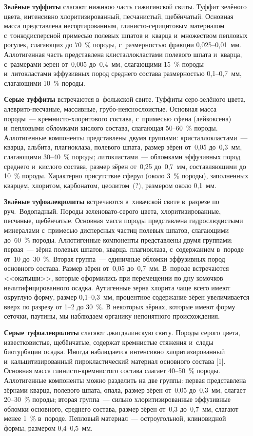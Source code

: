 \textbf{Зелёные туффиты} слагают нижнюю часть гижигинской свиты. Туффит зелёного цвета, интенсивно хлоритизированный, песчанистый, щебёнчатый. Основная масса представлена несортированным, глинисто-серицитовым материалом с~тонкодисперсной примесью полевых шпатов и~кварца и~множеством пепловых рогулек, слагающих до 70~\% породы, с~размерностью фракции 0,025--0,01~мм. Аллотигенная часть представлена клисталлокластами полевого шпата и~кварца, с~размерами зерен от~0,005 до~0,4~мм, слагающими 15~\% породы и~литокластами эффузивных пород среднего состава размерностью 0,1--0,7~мм, слагающими 10~\% породы. \enlargethispage{2\baselineskip}

\textbf{Серые туффиты} встречаются в~фолькской свите. Туффиты серо-зелёного цвета, алеврито-песчаные, массивные, грубо-неяснослоистые. Основная масса породы~--- крем\-ни\-сто-хло\-ри\-то\-во\-го состава, с~примесью сфена (лейкоксена) и~пепловыми обломками кислого состава, слагающая 50--60~\% породы. Аллотигенные компоненты представлены двумя группами: кристаллокластами~--- кварца, альбита, плагиоклаза, полевого шпата, размер зёрен от~0,05 до~0,3~мм, слагающими 30--40~\% породы; литокластами~--- обломками эффузивных пород среднего и~кислого состава, размер зёрен от~0,25 до~0,7~мм, составляющими до 10~\% породы. Характерно присутствие сферул (около 3~\% породы), заполненных кварцем, хлоритом, карбонатом, цеолитом~(?), размером около 0,1~мм.


\textbf{Зелёные туфоалевролиты} встречаются в~хивачской свите в~разрезе по руч.~Водопадный. Породы зеленовато-серого цвета, хлоритизированные, песчаные, щебёнчатые. Основная масса породы представлена гидрослюдистыми минералами с~примесью дисперсных частиц полевых шпатов, слагающими до~60~\% породы. Аллотигенные компоненты представлены двумя группами: первая~--- зёрна полевых шпатов, кварца, плагиоклаза, с~содержанием в~породе от~10 до~30~\%. Вторая группа~--- единичные обломки эффузивных пород основного состава. Размер зёрен от~0,05 до~0,7~мм. В~породе встречаются <<окатыши>>, которые оформились при перемещении по дну комочков нелитифицированного осадка. Аутигенные зерна хлорита чаще всего имеют округлую форму, размер 0,1--0,3~мм, процентное содержание зёрен увеличивается вверх по разрезу от 1--2 до 30~\%. В некоторых зёрнах, которые имеют форму сеточки, паутины, мы наблюдаем органику непонятного происхождения.

\textbf{Серые туфоалевролиты} слагают джигдалинскую свиту. Породы серого цвета, известковистые, щебёнчатые, содержат кремнистые стяжения и~следы биотурбации осадка. Иногда наблюдается интенсивно хлоритизированный и~кальцитизированный пирокластический материал основного состава [1]. Основная масса глинисто-кремнистого состава слагает 40--50~\% породы. Аллотигенные компоненты можно разделить на две группы: первая представлена зёрнами кварца, полевого шпата, опала, размер зёрен от~0,05 до~0,3~мм, слагает 20--30~\% породы; вторая группа~--- сильно хлоритизированные эффузивные обломки основного, среднего состава, размер зёрен от~0,3 до~0,7~мм, слагают менее 1~\% в~породе. Пепловый материал~--- остроугольной, клиновидной формы, размером 0,4--0,5~мм.

